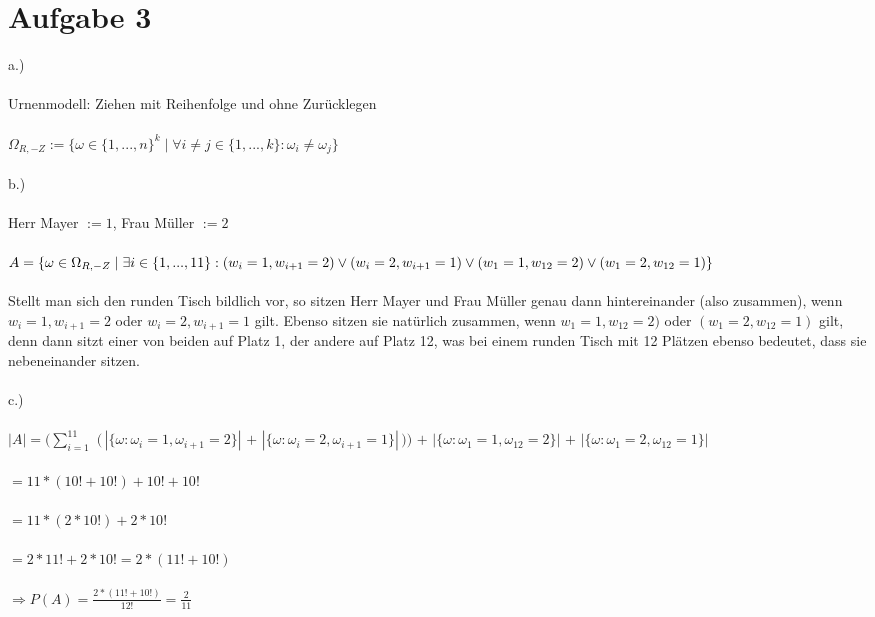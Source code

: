 \documentclass[10pt,a4paper]{article}
\begin{document}
	\section*{Aufgabe 3}

		\begin{text}
			a.) 
			\\
			\\
			Urnenmodell: Ziehen mit Reihenfolge und ohne Zurücklegen
			\\
			\\
			$\Omega_{R,-Z} := \{ \omega \in \{ 1, ..., n \}^k \; | \; \forall i \neq j \in \{ 1, ..., k \} : \omega_i \neq \omega_j \}$
			\\
			\\
			b.)
			\\
			\\
			Herr Mayer $:= 1$, \; Frau Müller $:= 2$
			\\
			\\
			$A = \{ \omega \in \Omega_{R,-Z} \; | \; \exists i \in \{ 1, ... , 11 \} : \\(w_i = 1, w_{i+1} = 2) \vee \\(w_i = 2, w_{i+1} = 1) \vee \\(w_1 = 1, w_{12} = 2) \vee \\(w_1 = 2, w_{12} = 1) \}$
			\\
			\\
			Stellt man sich den runden Tisch bildlich vor, so sitzen Herr Mayer und Frau Müller genau dann hintereinander (also zusammen), wenn $w_i = 1, w_{i+1} = 2$ oder $w_i = 2, w_{i+1} = 1$ gilt. Ebenso sitzen sie natürlich zusammen, wenn $w_1 = 1, w_{12} = 2)$ oder $(w_1 = 2, w_{12} = 1)$ gilt, denn dann sitzt einer von beiden auf Platz 1, der andere auf Platz 12, was bei einem runden Tisch mit 12 Plätzen ebenso bedeutet, dass sie nebeneinander sitzen.
			\\
			\\
			c.)
			\\
			\\
			$|A| = ( \sum_{i=1}^{11}$ 
			$( \, |\{ \omega : \omega_i = 1, \omega_{i+1} = 2\}| $
			$+$
			$|\{ \omega : \omega_i = 2, \omega_{i+1} = 1\}| \,) )$
			$+$
			$|\{ \omega : \omega_1 = 1, \omega_{12} = 2\}|$
			$+$
			$|\{ \omega : \omega_1 = 2, \omega_{12} = 1\}| \;$
			\\
			\\
			$ = 11 * ( 10! + 10! ) + 10! + 10!$
			\\
			\\
			$ = 11 * ( 2 * 10! ) + 2 * 10!$
			\\
			\\
			$ = 2 * 11! + 2 * 10! = 2 * ( 11! + 10! )$
			\\
			\\
			$ \Rightarrow P(A) = \frac{2 * (11! + 10!)}{12!} = \frac{2}{11}$
		\end{text}
\end{document}
